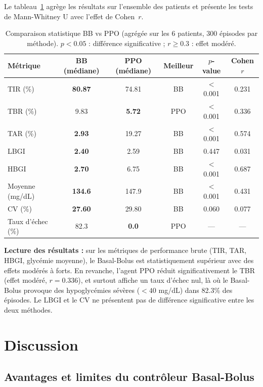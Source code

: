 \documentclass[a4paper,12pt]{report}
\begin{document}
Le tableau~\ref{tab:stats} agrège les résultats sur l'ensemble des patients et présente les tests de Mann-Whitney U avec l'effet de Cohen~$r$.

\begin{table}[H]
\centering
\caption{Comparaison statistique BB vs PPO (agrégée sur les 6 patients, 300 épisodes par méthode). $p < 0.05$ : différence significative ; $r \geq 0.3$ : effet modéré.}
\label{tab:stats}
\begin{tabular}{lccccc}
\toprule
\textbf{Métrique} & \textbf{BB (médiane)} & \textbf{PPO (médiane)} & \textbf{Meilleur} & \textbf{$p$-value} & \textbf{Cohen $r$} \\
\midrule
TIR (\%)      & \textbf{80.87} & 74.81 & BB  & $<$0.001 & 0.231 \\
TBR (\%)      & 9.83  & \textbf{5.72}  & PPO & $<$0.001 & 0.336 \\
TAR (\%)      & \textbf{2.93}  & 19.27 & BB  & $<$0.001 & 0.574 \\
LBGI          & \textbf{2.40}  & 2.59  & BB  & 0.447    & 0.031 \\
HBGI          & \textbf{2.70}  & 6.75  & BB  & $<$0.001 & 0.687 \\
Moyenne (mg/dL) & \textbf{134.6} & 147.9 & BB  & $<$0.001 & 0.431 \\
CV (\%)       & \textbf{27.60} & 29.80 & BB  & 0.060    & 0.077 \\
Taux d'échec (\%) & 82.3  & \textbf{0.0} & PPO & ---      & ---   \\
\bottomrule
\end{tabular}
\end{table}

\textbf{Lecture des résultats :} sur les métriques de performance brute (TIR, TAR, HBGI, glycémie moyenne), le Basal-Bolus est statistiquement supérieur avec des effets modérés à forts. En revanche, l'agent PPO réduit significativement le TBR (effet modéré, $r=0.336$), et surtout affiche un taux d'échec nul, là où le Basal-Bolus provoque des hypoglycémies sévères ($< 40$ mg/dL) dans 82.3\% des épisodes. Le LBGI et le CV ne présentent pas de différence significative entre les deux méthodes.

\newpage

\chapter{Discussion}

\section{Avantages et limites du contrôleur Basal-Bolus}
\end{document}
